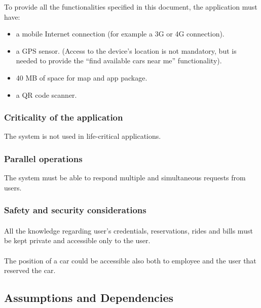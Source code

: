 \documentclass[english]{article}
\begin{document}
To provide all the functionalities specified in this document, the application must have:
\begin{itemize}
  \item{a mobile Internet connection (for example a 3G or 4G connection).}
  \item{a GPS sensor. (Access to the device’s location is not mandatory, but is needed to provide the “find available cars near me” functionality).}
  \item{40 MB of space for map and app package.}
  \item{a QR code scanner.}
\end{itemize}

\subsubsection{Criticality of the application}
The system is not used in life-critical applications.

\subsubsection{Parallel operations}
The system must be able to respond multiple and simultaneous requests from users.

\subsubsection{Safety and security considerations}
\paragraph{}
All the knowledge regarding user's credentials, reservations, rides and bills must be kept private and accessible only to the user.

\paragraph{}
The position of a car could be accessible also both to employee and the user that reserved the car.


\newpage
\subsection{Assumptions and Dependencies}
\end{document}
